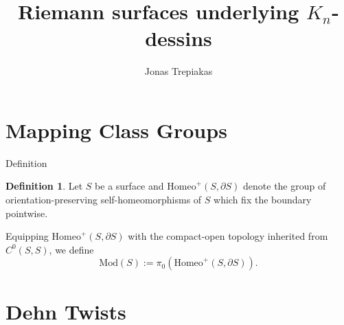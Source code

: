 \documentclass{beamer}
\title[Mapping Class Groups, Braid Groups and Geometric Representations] {Riemann surfaces underlying 
$K_n$-dessins}
\author{Jonas Trepiakas}
\date{}
\newtheorem{lem}[thm]{Lemma}
\theoremstyle{definition}
\newtheorem{df}[thm]{Definition}
\theoremstyle{remark}
\newcommand{\Mod}{{\mathrm{Mod}}}
\newcommand{\Homeo}{{\mathrm{Homeo}}}
\begin{document}
\section{Mapping Class Groups}

\begin{frame}{Definition}
    \begin{df}
        Let $S$ be a surface and
        $\Homeo^+ (S, \partial S)$
        denote the group of 
        orientation-preserving 
        self-homeomorphisms of $S$
        which fix the boundary
        pointwise.

        Equipping $\Homeo^+ 
    (S, \partial S)$ with the
    compact-open topology inherited
    from $C^0 (S,S)$, we
    define
    \[\Mod (S) :=
    \pi_0 (\Homeo^+ (S, \partial S)).\]
    \end{df}
\end{frame}



\section{Dehn Twists}
\end{document}

